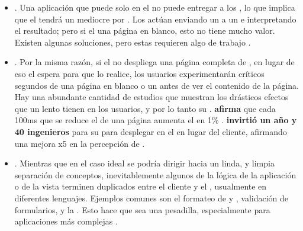 \begin{itemize}
	\item
		\textbf{\seoINT}. Una aplicación que puede solo \runCPT en el \clientSideAS no puede entregar \htmlNAME a los \crawlersINT, lo que implica que el \webINT tendrá un \seoINT mediocre por . Los \crawlersINT actúan enviando un \requestINT a un \webserverINT e interpretando el resultado; pero si el \serverAS \responseINT una página en blanco, esto no tiene mucho valor. Existen algunas soluciones, pero estas requieren algo de trabajo \cite{online_problems_sing_page_app}.
	\item
		\textbf{\performanceQA}. Por la misma razón, si el \serverAS no despliega una página completa de \htmlNAME, en lugar de eso el \clientSideAS espera para que \javaScriptNAME lo realice, los usuarios experimentarán críticos segundos de una página en blanco o un \loadingSpinnerCPT antes de ver el contenido de la página. Hay una abundante cantidad de estudios que muestran los drásticos efectos que un \siteINT lento tienen en los usuarios, y por lo tanto su \revenueQA \cite{online_fastView_web_perfor_opti_accele}. \textbf{\amazonNAME afirma} que cada 100ms que se reduce el \loadTimeCPT de una página aumenta el \revenueQA en 1\% \cite{kohavi2007online} \cite{online_psychology_web_performance}.\textbf{ \twitterNAME invirtió un año y 40 ingenieros} para \rebuildingPL su \siteINT para desplegar en el \serverAS en lugar del cliente, afirmando una mejora x5 en la percepción de \loadingTimeCPT \cite{online_improving_web_performance_twitter}.
	\item
		\textbf{\maintainabilityQA}. Mientras que en el caso ideal se podría dirigir hacia un linda, y limpia separación de conceptos, inevitablemente algunos \bitsPC de la lógica de la aplicación o de la vista terminen duplicados entre el cliente y el \serverAS, usualmente en diferentes lenguajes. Ejemplos comunes son el formateo de  \datePL y \currencyCPT, validación de formularios, y la \routingLogicAS. Esto hace que \maintenanceQA sea una pesadilla, especialmente para aplicaciones más complejas \cite{online_problems_sing_page_app}.

\end{itemize}
